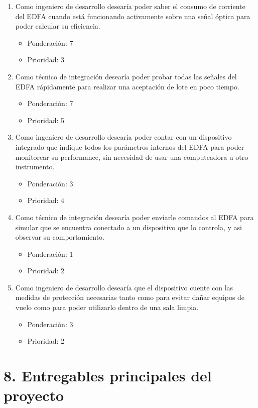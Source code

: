\documentclass[
11pt, %
codirector, %
]{charter}
\begin{document}
\begin{enumerate}
	\item Como ingeniero de desarrollo desearía poder saber el consumo de corriente del EDFA cuando está funcionando activamente sobre una señal óptica para poder calcular su eficiencia.
	\begin{itemize}
		\item Ponderación: 7
		\item Prioridad: 3
	\end{itemize}
	\item Como técnico de integración desearía poder probar todas las señales del EDFA rápidamente para realizar una aceptación de lote en poco tiempo.
	\begin{itemize}
		\item Ponderación: 7
		\item Prioridad: 5
	\end{itemize}
	\item Como ingeniero de desarrollo desearía poder contar con un dispositivo integrado que indique todos los parámetros internos del EDFA para poder monitorear su performance, sin necesidad de usar una computeadora u otro instrumento.
	\begin{itemize}
		\item Ponderación: 3
		\item Prioridad: 4
	\end{itemize}
	\item Como técnico de integración desearía poder enviarle comandos al EDFA para simular que se encuentra conectado a un dispositivo que lo controla, y asi observar su comportamiento.
	\begin{itemize}
		\item Ponderación: 1
		\item Prioridad: 2
	\end{itemize}
	\item Como ingeniero de desarrollo desearía que el dispositivo cuente con las medidas de protección necesarias tanto como para evitar dañar equipos de vuelo como para poder utilizarlo dentro de una sala limpia.
	\begin{itemize}
		\item Ponderación: 3
		\item Prioridad: 2
	\end{itemize}
\end{enumerate}

\section{8. Entregables principales del proyecto}
\label{sec:entregables}
\end{document}
